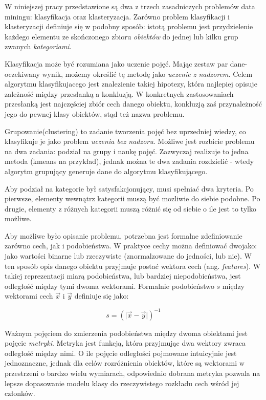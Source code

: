 \documentclass[12pt,a4paper,oneside]{report} %
\begin{document}
W niniejszej pracy przedstawione są dwa z trzech zasadniczych problemów data miningu: klasyfikacja oraz klasteryzacja. Zarówno problem klasyfikacji i klasteryzacji definiuje się w podobny sposób: istotą problemu jest przydzielenie każdego elementu ze skończonego zbioru \emph{obiektów} do jednej lub kilku grup zwanych \emph{kategoriami}. \par

Klasyfikacja może być rozumiana jako uczenie pojęć. Mając zestaw par dane\--ocze\-ki\-wa\-ny wynik, możemy określić tę metodę jako \emph{uczenie z nadzorem}. Celem algorytmu klasyfikujacego jest znalezienie takiej hipotezy, która najlepiej opisuje zależność między przesłanką a konkluzją. W konkretnych zastosowaniach przesłanką jest najczęściej zbiór cech danego obiektu, konkluzją zaś przynależność jego do pewnej klasy obiektów, stąd też nazwa problemu. \par

Grupowanie(clustering) to zadanie tworzenia pojęć bez uprzedniej wiedzy, co klasyfikuje je jako problem \emph{uczenia bez nadzoru}. Możliwe jest rozbicie problemu na dwa zadania: podział na grupy i naukę pojęć. Zazwyczaj realizuje to jedna metoda (kmeans na przykład), jednak można te dwa zadania rozdzielić - wtedy algorytm grupujący generuje dane do algorytmu klasyfikującego.\par

Aby podział na kategorie był satysfakcjonujący, musi spełniać dwa kryteria. Po pierwsze, elementy wewnątrz kategorii muszą być mozliwie do siebie podobne. Po drugie, elementy z różnych kategorii muszą różnić się od siebie o ile jest to tylko możliwe.\par

Aby możliwe było opisanie problemu, potrzebna jest formalne zdefiniowanie zarówno cech, jak i podobieństwa. W praktyce cechy można definiować dwojako: jako wartości binarne lub rzeczywiste (znormalzowane do jedności, lub nie). W ten sposób opis danego obiektu przyjmuje postać wektora cech (ang. \emph{features}). W takiej reprezentacji miarą podobieństwa, lub bardziej niepodobieństwa, jest odległość między tymi dwoma wektorami. Formalnie podobieństwo $s$ między wektorami cech $\vec{x}$ i $\vec{y}$ definiuje się jako:\par

\begin{equation}
s = ( \lvert \vec{x} - \vec{y} \rvert )^{-1}
\end{equation}
\label{similarity}

Ważnym pojęciem do zmierzenia podobieństwa między dwoma obiektami jest pojęcie \emph{metryki}. Metryka jest funkcją, która przyjmując dwa wektory zwraca odległość między nimi. O ile pojęcie odległości pojmowane intuicyjnie jest jednoznaczne, jednak dla celów rozróżnienia obiektów, które są wektorami w przestrzeni o bardzo wielu wymiarach, odpowiednio dobrana metryka pozwala na lepsze dopasowanie modelu klasy do rzeczywistego rozkładu cech wśród jej członków.\par
\end{document}
